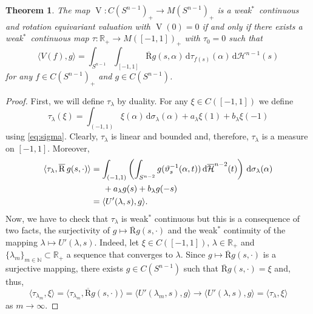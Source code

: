 \documentclass[11pt, a4paper]{amsart}
\newtheorem{theorem}[proposition]{Theorem}
\renewcommand{\d}{\,\mathrm{d}}
\newcommand{\hn}{\mathcal H^{n-1}}
\newcommand{\rp}{\mathbb R_{\scriptscriptstyle +}}
\newcommand{\sn}{{S^{n-1}}}
\newcommand{\sm}{S^{n-2}}
\renewcommand{\d}{\,\mathrm{d}}
\newcommand{\oV}{\operatorname{V}}
\newcommand{\measn}{M(\sn )_{\scriptscriptstyle +}}
\newcommand{\cfn}{C(\sn )_{\scriptscriptstyle +}}
\newcommand{\radon}{\operatorname{\overline R}}
\newcommand{\rhot}{\tau}
\newcommand{\G}{\xi}
\begin{document}
\begin{theorem}\label{th:representation equivariant}
The map $\oV\colon \cfn\to \measn$ is a weak$^*$~continuous and rotation equivariant valuation with $\oV(0)=0$ if and only if there exists a weak$^*$~continuous map $\rhot\colon \rp\to M([-1,1])_{\scriptscriptstyle +}$  with $\rhot_0=0$ such that
\[
\langle V (f),g\rangle= \int_\sn \int_{[-1,1]}\radon g(s,\alpha)\d\rhot_{f(s)}(\alpha)\d\hn(s) 
\]
for any $f\in \cfn$ and $g\in C(\sn)$.
\end{theorem}
\begin{proof}
First, we will define $\rhot_\lambda$ by duality. For any $\G\in C([-1,1])$ we define
\[
    \rhot_\lambda(\G) =\int_{(-1,1)} \G(\alpha)\d\sigma_\lambda(\alpha)+ a_\lambda     \G(1)+     b_\lambda \G(-1)
\]
using \eqref{eq:sigma}.
Clearly, $\rhot_\lambda$ is linear and bounded and, therefore, $\rhot_\lambda$ is a measure on $[-1,1]$. Moreover,
\begin{align*}
    \langle \rhot_\lambda,\radon g (s, \cdot)\rangle &=\int_{(-1,1)} \left(\int_{\sm}g(\vartheta_s^{-1}(\alpha,t))\d \overline{\mathcal{H}}^{n-2}(t)\right)\d\sigma_\lambda(\alpha)\\
    &\hspace{5mm}+a_\lambda g(s)+b_\lambda g(-s)\\
    &=\langle U'(\lambda,s),g\rangle.
\end{align*}
Now, we have to check that $\rhot_\lambda $ is weak$^*$ continuous but this is a consequence of two facts, the surjectivity of $g\mapsto \radon g (s,\cdot)$ and the weak$^*$ continuity of the mapping $\lambda\mapsto U'(\lambda,s)$. Indeed, let $\G\in C([-1,1])$, $\lambda\in\rp$ and $\{\lambda_m\}_{m\in\mathbb{N}}\subset \rp$ a sequence that converges to $\lambda$. Since $g\mapsto \radon g (s,\cdot)$ is a surjective mapping, there exists $g\in C(\sn)$ such that $\radon g(s, \cdot)=\G$ and, thus,
\[
    \langle \rhot_{\lambda_m},\G\rangle=\langle \rhot_{\lambda_m},\radon g (s, \cdot)\rangle =\langle U'(\lambda_m,s),g\rangle\to \langle U'(\lambda,s),g\rangle=\langle \rhot_\lambda,\G\rangle
\]
as $m\to\infty$.


\end{proof}
\end{document}
